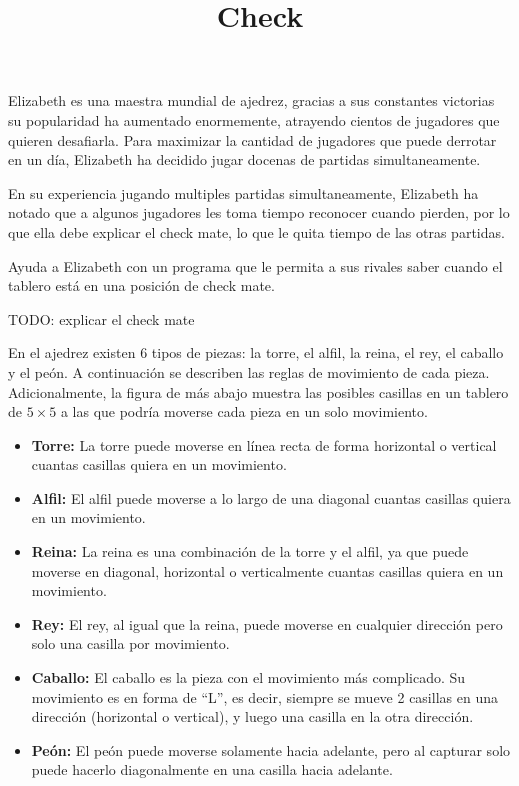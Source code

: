 \documentclass{oci}
\title{Check}
\begin{document}
\begin{problemDescription}
Elizabeth es una maestra mundial de ajedrez, gracias a sus constantes
victorias su popularidad ha aumentado enormemente, atrayendo cientos
de jugadores que quieren desafiarla. Para maximizar la cantidad de
jugadores que puede derrotar en un día, Elizabeth ha decidido jugar
docenas de partidas simultaneamente. 

En su experiencia jugando multiples partidas simultaneamente,
Elizabeth ha notado que a algunos jugadores les toma tiempo reconocer
cuando pierden, por lo que ella debe explicar el check mate, lo que le
quita tiempo de las otras partidas. 

Ayuda a Elizabeth con un programa que le permita a sus rivales saber
cuando el tablero está en una posición de check mate.

TODO: explicar el check mate

  En el ajedrez existen 6 tipos de piezas: la torre, el alfil, la reina, el rey, el caballo y el peón.
  A continuación se describen las reglas de movimiento de cada pieza.
  Adicionalmente, la figura de más abajo muestra las posibles casillas en un tablero de $5\times 5$ a las que podría moverse cada pieza en un solo movimiento.
  \begin{itemize}
    \item \textbf{Torre:} La torre puede moverse en línea recta de forma horizontal o vertical cuantas casillas quiera en un movimiento.
    \item \textbf{Alfil:} El alfil puede moverse a lo largo de una diagonal cuantas casillas quiera en un movimiento.
    \item \textbf{Reina:} La reina es una combinación de la torre y el alfil, ya que puede moverse en diagonal, horizontal o verticalmente cuantas casillas quiera en un movimiento.
    \item \textbf{Rey:} El rey, al igual que la reina, puede moverse en cualquier dirección pero solo una casilla por movimiento.
    \item \textbf{Caballo:} El caballo es la pieza con el movimiento más complicado. Su movimiento es en forma de ``L'', es decir, siempre se mueve 2 casillas en una dirección (horizontal o vertical), y luego una casilla en la otra dirección.
    \item \textbf{Peón:} El peón puede moverse solamente hacia adelante, pero al capturar solo puede hacerlo diagonalmente en una casilla hacia adelante.
  \end{itemize}

\end{problemDescription}
\end{document}
